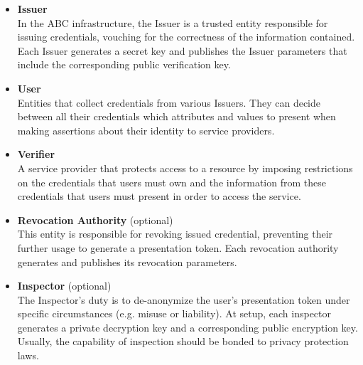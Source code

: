\begin{itemize}
	\item \textbf{Issuer}\\
	In the ABC infrastructure, the Issuer is a trusted entity responsible for issuing credentials, vouching for the correctness of the information contained. Each Issuer generates a secret key and publishes the Issuer parameters that include the corresponding public verification key.
	
	\item \textbf{User}\\
	Entities that collect credentials from various Issuers. They can decide between all their credentials which attributes and values to present when making assertions about their identity to service providers.
	
	\item \textbf{Verifier}\\
	A service provider that protects access to a resource by imposing restrictions on the credentials that users must own and the information from these credentials that users must present in order to access the service.
	
	\item \textbf{Revocation Authority} (optional)\\
	This entity is responsible for revoking issued credential, preventing their further usage to generate a presentation token. Each revocation authority generates and publishes its revocation parameters.
	
	\item \textbf{Inspector} (optional)\\
	The Inspector's duty is to de-anonymize the user's presentation token under specific circumstances (e.g. misuse or liability). At setup, each inspector generates a private decryption key and a corresponding public encryption key. Usually, the capability of inspection should be bonded to privacy protection laws.
	
\end{itemize}


